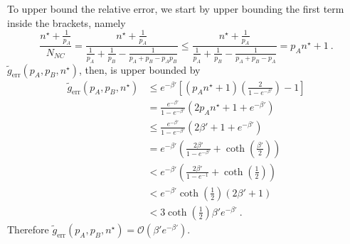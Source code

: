 \documentclass[aps,pra,reprint,superscriptaddress]{revtex4-1}
\newcommand{\nstar}{n^{\star}}
\begin{document}
To upper bound the relative error, we start by upper bounding the first term inside the brackets, namely
\begin{equation}
\frac{\nstar + \frac{1}{p_A}}{N_{NC}}= \frac{\nstar + \frac{1}{p_A}}{\frac{1}{p_A} + \frac{1}{p_B} - \frac{1}{p_A + p_B-p_A p_B}} \le \frac{\nstar + \frac{1}{p_A}}{\frac{1}{p_A} + \frac{1}{p_B} - \frac{1}{p_A + p_B-p_A}} = p_A \nstar + 1\ .
\end{equation}
$\tilde{g}_\text{err}(p_A, p_B, \nstar)$, then, is upper bounded by
\begin{align}
\tilde{g}_\text{err}(p_A, p_B, \nstar)	&\le e^{-\beta'}\left[(p_A \nstar + 1)\left(\frac{2}{1-e^{-\beta'}}\right) -1 \right] \\
							&= \frac{e^{-\beta'}}{1 - e^{-\beta'}} (2p_A\nstar + 1 + e^{-\beta'}) \\
							&\le \frac{e^{-\beta'}}{1 - e^{-\beta'}} (2\beta' + 1 + e^{-\beta'}) \\
							&= e^{-\beta'}\left(\frac{2\beta'}{1-e^{-\beta'}} + \coth\left(\frac{\beta'}{2}\right)\right) \\
							&< e^{-\beta'}\left(\frac{2\beta'}{1-e^{-1}} + \coth\left(\frac{1}{2}\right)\right) \\
							& < e^{-\beta'}\coth\left(\frac{1}{2}\right)\left(2\beta' + 1\right) \\
							&< 3\coth\left(\frac{1}{2}\right)\beta' e^{-\beta'}\ .
\end{align}
Therefore $\tilde{g}_\text{err}(p_A, p_B, \nstar) = \mathcal{O}\left(\beta' e^{-\beta'}\right)$.
\end{document}
